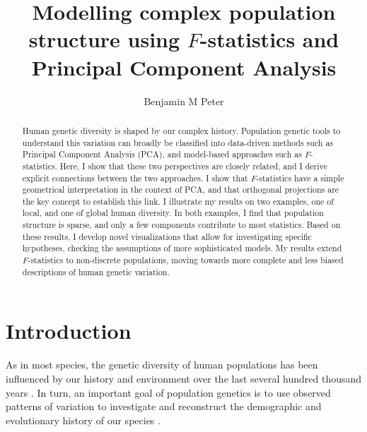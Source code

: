 \documentclass[12pt,fullpage, a4paper]{article}
\title{Modelling complex population structure using $F$-statistics and Principal Component Analysis}
\author{Benjamin M Peter}
\begin{document}
	\maketitle
\begin{abstract}
Human  genetic diversity is shaped by our complex history. Population genetic tools to understand this variation can broadly be classified into data-driven methods such as Principal Component Analysis (PCA), and model-based approaches such as $F$-statistics.
Here, I show that these two perspectives are closely related, and I derive explicit connections between the two approaches. I show that $F$-statistics have a simple geometrical interpretation in the context of PCA, and that orthogonal projections are the key concept to establish this link. I illustrate my results on two examples, one of local, and one of global human diversity. In both examples, I find that population structure is sparse, and only a few components contribute to most statistics. Based on these results, I develop novel visualizations that allow for investigating specific hypotheses, checking the assumptions of more sophisticated models. My results extend $F$-statistics to non-discrete populations, moving towards more complete and less biased descriptions of human genetic variation. 
\end{abstract}
\section{Introduction}
As in most species, the genetic diversity of human populations has been influenced by our history and environment over the last several hundred thousand years \citep[e.g][]{cavalli-sforza1994,marciniak2017, reich2018a, nielsen2017}. In turn, an important goal of population genetics is to use observed patterns of variation to  investigate and reconstruct the demographic and evolutionary history of our species \citep{schraiber2015, orlando2021}. 
\end{document}

